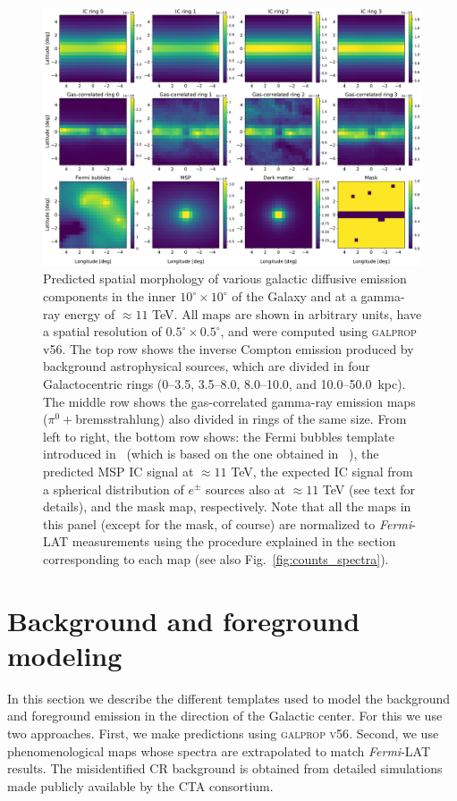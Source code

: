 \documentclass[doublespace,nopageskip]{VTthesis} %
\begin{document}
\begin{figure}[htb!]
    \centering
    \includegraphics[width=\textwidth]{Figures/CTA/maps_orig.pdf}
    \caption{Predicted spatial morphology of various galactic diffusive emission components in the inner $10^\circ \times 10^\circ$ of the Galaxy and at a gamma-ray energy of $\approx 11$ TeV. All maps are shown in arbitrary units, have a spatial resolution of $0.5^\circ \times 0.5^\circ$, and were computed using \textsc{galprop} v56. The top row shows the inverse Compton emission produced by background astrophysical sources, which are divided in four Galactocentric rings (0--3.5, 3.5--8.0, 8.0--10.0, and 10.0--50.0~kpc). The middle row shows the gas-correlated gamma-ray emission maps ($\pi^0+$bremsstrahlung) also divided in rings of the same size. From left to right, the bottom row shows: the Fermi bubbles template introduced in~\citet{Macias:2019omb} (which is based on the one obtained in ~\citet{Fermi-bubbles:2014sfa}), the predicted MSP IC signal at $\approx 11$ TeV, the expected IC signal from a spherical distribution of $e^{\pm}$ sources also at $\approx 11$ TeV (see text for details), and the mask map, respectively. Note that all the maps in this panel (except for the mask, of course) are normalized to \textit{Fermi}-LAT measurements using the procedure explained in the section corresponding to each map (see also Fig.~\ref{fig:counts_spectra}).}
    \label{fig:galpropmaps}
\end{figure}

\section{Background and foreground modeling}
\label{sec:backgroundtemplates}
In this section we describe the different templates used to model the background and foreground emission in the direction of the Galactic center. For this we use two approaches. First, we make predictions using \textsc{galprop v56}. Second, we use phenomenological maps whose spectra are extrapolated to match \textit{Fermi}-LAT results. The misidentified CR background is obtained from detailed simulations made publicly available by the CTA consortium.
\end{document}
